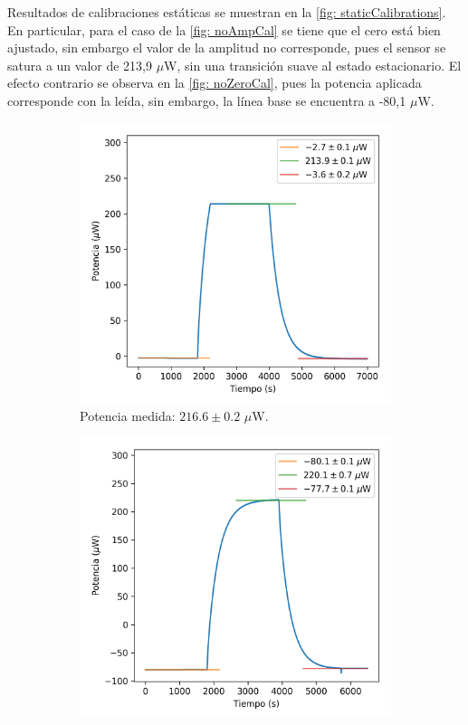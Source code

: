 	Resultados de calibraciones estáticas se muestran en la \autoref{fig: staticCalibrations}. En particular, para el caso de la \autoref{fig: noAmpCal} se tiene que el cero está bien ajustado, sin embargo el valor de la amplitud no corresponde, pues el sensor se satura a un valor de 213,9 $\mu$W, sin una transición suave al estado estacionario. El efecto contrario se observa en la \autoref{fig: noZeroCal}, pues la potencia aplicada corresponde con la leída, sin embargo, la línea base se encuentra a -80,1 $\mu$W.
	\begin{figure}[h]
		\centering
		\begin{subfigure}{0.45\linewidth}
			\includegraphics[width=\linewidth]{../Data/ElectricalCalibrations/Static/Calibration1}
			\caption{Potencia medida: $216.6 \pm 0.2$ $\mu$W.}
			\label{fig: noAmpCal}
		\end{subfigure}
		\begin{subfigure}{0.45\linewidth}
			\includegraphics[width=\linewidth]{../Data/ElectricalCalibrations/Static/Calibration0}

\end{subfigure}
\end{figure}
